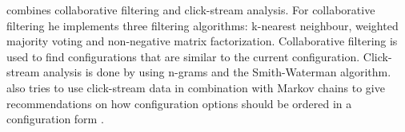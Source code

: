 \citeauthor{wetzelPersonalisierterUndLernender2017} combines collaborative filtering and click-stream analysis. For collaborative filtering he implements three filtering algorithms: k-nearest neighbour, weighted majority voting and non-negative matrix factorization. Collaborative filtering is used to find configurations that are similar to the current configuration. Click-stream analysis is done by using n-grams and the Smith-Waterman algorithm. \citeauthor{wetzelPersonalisierterUndLernender2017} also tries to use click-stream data in combination with Markov chains to give recommendations on how configuration options should be ordered in a configuration form
\cite{wetzelPersonalisierterUndLernender2017}.


